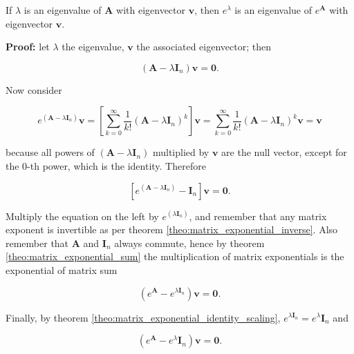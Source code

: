 \begin{lemma}\label{lemma:matrix_exp_eigen}
	If $\lambda$ is an eigenvalue of $\mathbf{A}$ with eigenvector $\mathbf{v}$, then $e^{\lambda}$ is an eigenvalue of $e^{\mathbf{A}}$ with eigenvector $\mathbf{v}$.
\end{lemma}
\noindent\textbf{Proof: } let $\lambda$ the eigenvalue, $\mathbf{v}$ the associated eigenvector; then

\begin{equation}
	\left(\mathbf{A} - \lambda\mathbf{I}_n\right)\mathbf{v} = \mathbf{0} .
\end{equation}

	Now consider

\begin{equation}
	e^{\left(\mathbf{A} - \lambda\mathbf{I}_n\right)}\mathbf{v} = \left[\sum_{k=0}^\infty \dfrac{1}{k!} \left(\mathbf{A} - \lambda\mathbf{I}_n\right)^k\right]\mathbf{v} =  \sum_{k=0}^\infty \dfrac{1}{k!} \left(\mathbf{A} - \lambda\mathbf{I}_n\right)^k\mathbf{v} = \mathbf{v}
\end{equation}

	\noindent because all powers of $\left(\mathbf{A} - \lambda\mathbf{I}_n\right)$ multiplied by $\mathbf{v}$ are the null vector, except for the 0-th power, which is the identity. Therefore

\begin{equation}
	\left[e^{\left(\mathbf{A} - \lambda\mathbf{I}_n\right)} - \mathbf{I}_n\right]\mathbf{v} = \mathbf{0}.
\end{equation}

	Multiply the equation on the left by $e^{\left(\lambda\mathbf{I}_n\right)}$, and remember that any matrix exponent is invertible as per theorem \ref{theo:matrix_exponential_inverse}. Also remember that $\mathbf{A}$ and $\mathbf{I}_n$ always commute, hence by theorem \ref{theo:matrix_exponential_sum} the multiplication of matrix exponentials is the exponential of matrix sum

\begin{equation}
	\left(e^{\mathbf{A}} - e^{\lambda\mathbf{I}_n}\right)\mathbf{v} = \mathbf{0} .
\end{equation}

	Finally, by theorem \ref{theo:matrix_exponential_identity_scaling}, $e^{\lambda\mathbf{I}_n} = e^{\lambda}\mathbf{I}_n$ and 

\begin{equation}
	\left(e^{\mathbf{A}} - e^{\lambda}\mathbf{I}_n\right)\mathbf{v} = \mathbf{0} .
\end{equation}


